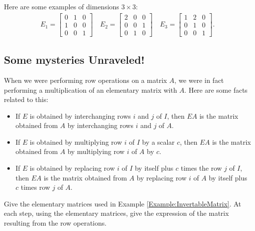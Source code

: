 \documentclass[12pt,a4paper]{article}
\newcounter{example}[section]
\begin{document}
	\begin{example}
	Here are some examples of dimensions $3 \times 3$:
		\begin{align*}
		E_1 = \begin{bmatrix}
		0 & 1 & 0\\ 1 & 0 & 0 \\ 0 & 0 & 1
		\end{bmatrix}
		\quad
		E_2 = \begin{bmatrix}
		2 & 0 & 0 \\ 0 & 0 & 1 \\ 0 & 1 & 0
		\end{bmatrix}
		\quad
		E_3 = \begin{bmatrix}
		1 & 2 & 0 \\ 0 & 1 & 0 \\ 0 & 0 & 1
		\end{bmatrix} .
		\end{align*}
	\end{example}
	
\newpage

\subsection{Some mysteries Unraveled!}
When we were performing row operations on a matrix $A$, we were in fact performing a multiplication of an elementary matrix with $A$. Here are some facts related to this:
	\begin{itemize}
		\item If $E$ is obtained by interchanging rows $i$ and $j$ of $I$, then $EA$ is the matrix obtained from $A$ by interchanging rows $i$ and $j$ of $A$.
		\item If $E$ is obtained by multiplying row $i$ of $I$ by a scalar $c$, then $EA$ is the matrix obtained from $A$ by multiplying row $i$ of $A$ by $c$.
		\item If $E$ is obtained by replacing row $i$ of $I$ by itself plus $c$ times the row $j$ of $I$, then $EA$ is the matrix obtained from $A$ by replacing row $i$ of $A$ by itself plus $c$ times row $j$ of $A$.
	\end{itemize}
	
	\vspace*{12pt}
	
	\begin{example}
	Give the elementary matrices used in Example \ref{Example:InvertableMatrix}. At each step, using the elementary matrices, give the expression of the matrix resulting from the row operations.
	\end{example}
	
\end{document}
